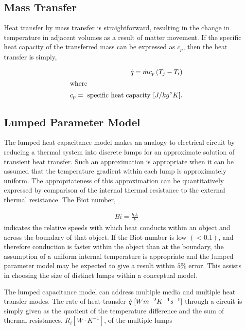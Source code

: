 \subsection{Mass Transfer}

Heat transfer by mass transfer is straightforward, resulting in the change in 
temperature in adjacent volumes as a result of matter movement. If the specific 
heat capacity of the transferred mass can be expressed as $c_p$, then the heat 
transfer is simply, 

\begin{align}
  \dot{q} = \dot{m}c_p\left( T_j - T_i \right)\\
  \intertext{where}
  c_p = \mbox{ specific heat capacity } [J/kg^{\circ}K].\nonumber
\end{align}

\subsection{Lumped Parameter Model}
\label{sec:lumpedparam}

The lumped heat capacitance model makes an analogy to electrical circuit by 
reducing a thermal system into discrete lumps for an approximate solution of 
transient heat transfer. Such an approximation is 
appropriate when it can be assumed that the temperature gradient within each 
lump is approximately uniform. The appropriateness of this approximation can be
quantitatively expressed by comparison of the internal thermal resistance to the 
external thermal resistance. The Biot number, 

\begin{align}
  Bi = \frac{hA}{k}
  \label{biot}
\end{align}
indicates the relative speeds with which heat conducts within an object and 
across the boundary of that object. If the Biot number is low $(<0.1)$, and 
therefore conduction is faster within the object than at the boundary, the 
assumption of a uniform internal temperature is appropriate and the lumped 
parameter model may be expected to give a result within $5\%$ 
error\cite{incropera_fundamentals_2006}. This assists in choosing the size of 
distinct lumps within a conceptual model. 

The lumped capacitance model can address multiple media and multiple heat
transfer modes. The rate of heat transfer $\dot{q}\hspace{1mm}[Wm^{-2}K^{-1}s^{-1}]$ 
through a circuit is simply given as the quotient of the temperature 
difference and the sum of thermal resistances, $R_i [W\cdot K^{-1}]$,
of the multiple lumps 

